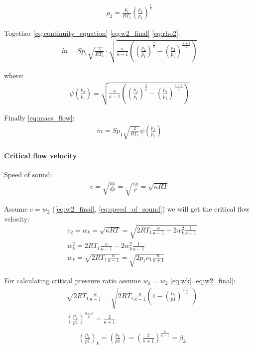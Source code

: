 \documentclass[class=article, crop=false]{standalone}
\begin{document}
\begin{align}
    \rho_2 = \frac{p_1}{RT_1} (\frac{p_2}{p_1})^{\frac{1}{\kappa}}
    \label{eq:rho2}
\end{align}

Together \ref{eq:continuity_equation} \ref{eq:w2_final} \ref{eq:rho2}:
\begin{align}
    \dot{m} = S p_1 \sqrt{\frac{2}{RT_1}} \cdot
    \sqrt{\frac{\kappa}{\kappa-1}\left(\left(\frac{p_2}{p_1}\right)^\frac{2}{\kappa} -
    \left(\frac{p_2}{p_1}\right)^\frac{\kappa + 1}{\kappa}\right)}
    \label{}
\end{align}

where: 
\begin{align}
    \psi\left(\frac{p_2}{p_1}\right) =  
    \sqrt{\frac{\kappa}{\kappa-1}\left(\left(\frac{p_2}{p_1}\right)^\frac{2}{\kappa} -
    \left(\frac{p_2}{p_1}\right)^\frac{\kappa + 1}{\kappa}\right)}
    \label{eq:psi}
\end{align}

Finally \ref{eq:mass_flow}:
\begin{align}
    \dot{m} = Sp_1\sqrt{\frac{2}{RT_1}} \psi\left(\frac{p_2}{p_1}\right)
    \label{eq:mass_flow}
\end{align}

\paragraph{Critical flow velocity}
Speed of sound:
\begin{align}
    c = \sqrt{\frac{dp}{d\rho}} = 
    \sqrt{\frac{\kappa p}{\rho}} = \sqrt{\kappa R T}
    \label{eq:speed_of_sound}
\end{align}

Assume $c=w_2$ (\ref{eq:w2_final}, \ref{eq:speed_of_sound}) we will get the
critical flow velocity:
\begin{align}
    &c_2 = w_k = \sqrt{\kappa RT} =
    \sqrt{2RT_1\frac{\kappa}{\kappa-1}-2w_k^2\frac{1}{\kappa-1}} \\
    &w_k^2 = 2RT_1\frac{\kappa}{\kappa-1}-2w_k^2\frac{1}{\kappa-1} \\
    &w_k = \sqrt{2RT_1\frac{\kappa}{\kappa-1}} = \sqrt{2p_1 \nu_1 \frac{\kappa}{\kappa + 1}}
    \label{eq:wk}
\end{align}


For calculating critical pressure ratio assume $w_k = w_2$ \ref{eq:wk}
\ref{eq:w2_final}:
\begin{align}
    &\sqrt{2RT_1\frac{\kappa}{\kappa-1}}  = 
    \sqrt{2RT_1 \frac{\kappa}{\kappa-1}
    \left(1-\left(\frac{p_2}{p1}\right)^{\frac{\kappa+1}{\kappa}}\right)} \\
    &\left(\frac{p_2}{p1}\right)^\frac{\kappa-1}{\kappa} = \frac{2}{\kappa+1} \\
\end{align}
\begin{align}
    &\left(\frac{p_2}{p1}\right)_k =
    \left(\frac{p_k}{p1}\right) =
    \left(\frac{2}{\kappa+1}\right)^\frac{\kappa}{\kappa-1}=\beta_k
    \label{eq:beta_k}
\end{align}
\end{document}
